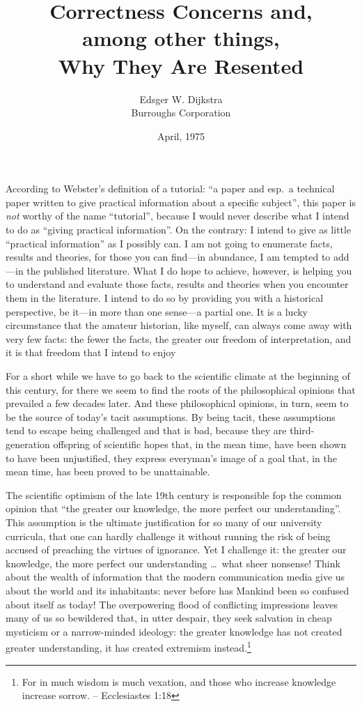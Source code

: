 \documentclass[12pt,letterpaper]{article}
\title{Correctness Concerns and,\\
among other things,\\
Why They Are Resented}
\author{Edsger W. Dijkstra\\
Burroughs Corporation}
\date{April, 1975}
\begin{document}
\maketitle

\noindent According to Webster's definition of a tutorial: ``a paper and esp.~a technical paper written 
to give practical information about a specific subject'', this paper is \emph{not} worthy of the name
``tutorial'', because I would never describe what I intend 
to do as ``giving practical information''. On the 
contrary: I intend to give as little ``practical 
information'' as I possibly can. I am not going to 
enumerate facts, results and theories, for those 
you can find---in abundance, I am tempted to add---in the published literature. What I do hope to 
achieve, however, is helping you to understand and 
evaluate those facts, results and theories when 
you encounter them in the literature. I intend to 
do so by providing you with a historical perspective, be it---in more than one sense---a partial 
one. It is a lucky circumstance that the amateur 
historian, like myself, can always come away with 
very few facts: the fewer the facts, the greater 
our freedom of interpretation, and it is that freedom that I intend to enjoy

For a short while we have to go back to the 
scientific climate at the beginning of this century, for there we seem to find the roots of the 
philosophical opinions that prevailed a few decades later. And these philosophical opinions, in 
turn, seem to be the source of today's tacit assumptions. By being tacit, these assumptions tend to 
escape being challenged and that is bad, because 
they are third-generation offspring of scientific 
hopes that, in the mean time, have been shown to 
have been unjustified, they express everyman's image 
of a goal that, in the mean time, has been proved 
to be unattainable. 

The scientific optimism of the late 19th century is responsible fop the common opinion that ``the 
greater our knowledge, the more perfect our understanding''. This assumption is the ultimate justification for so many of our university curricula, that 
one can hardly challenge it without running the risk 
of being accused of preaching the virtues of ignorance. Yet I challenge it: the greater our knowledge, 
the more perfect our understanding \ldots\ what sheer 
nonsense! Think about the wealth of information 
that the modern communication media give us about 
the world and its inhabitants: never before has Mankind been so confused about itself as today! 
The overpowering flood of conflicting impressions 
leaves many of us so bewildered that, in utter despair, they seek salvation in cheap mysticism or 
a narrow-minded ideology: the greater knowledge 
has not created greater understanding, it has created extremism instead.\footnote{For in much wisdom is much vexation, and those who increase knowledge increase sorrow. -- Ecclesiastes 1:18}
\end{document}
